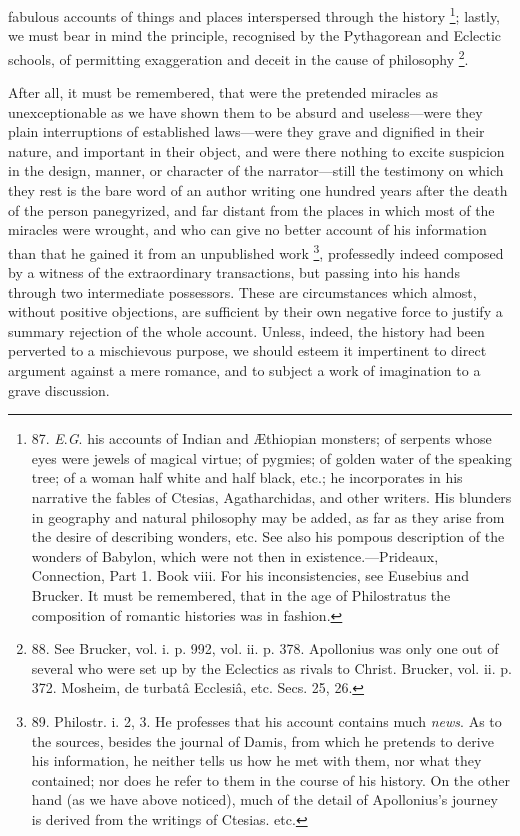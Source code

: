 fabulous accounts of things and places interspersed through the
history \footnote{87.
\emph{E}.\emph{G}. his accounts of Indian and Æthiopian monsters; of
serpents whose eyes were jewels of magical virtue; of pygmies; of
golden water of the speaking tree; of a woman half white and half
black, etc.; he incorporates in his narrative the fables of Ctesias,
Agatharchidas, and other writers. His blunders in geography and
natural philosophy may be added, as far as they arise from the desire
of describing wonders, etc. See also his pompous description of the
wonders of Babylon, which were not then in existence.—Prideaux,
Connection, Part 1. Book viii. For his inconsistencies, see Eusebius
and Brucker. It must be remembered, that in the age of Philostratus
the composition of romantic histories was in fashion.}; lastly, we
must bear in mind the principle, recognised by the Pythagorean and
Eclectic schools, of permitting exaggeration and deceit in the cause
of philosophy \footnote{88.
See Brucker, vol. i. p. 992, vol. ii. p. 378. Apollonius was only one
out of several who were set up by the Eclectics as rivals to Christ.
Brucker, vol. ii. p. 372. Mosheim, de turbatâ Ecclesiâ, etc. Secs.
25, 26.}.

After all, it must be
remembered, that were the pretended miracles as unexceptionable as we
have shown them to be absurd and useless—were they plain
interruptions of established laws—were they grave and dignified in
their nature, and important in their object, and were there nothing to
excite suspicion in the design, manner, or character of the
narrator—still the testimony on which they rest is the bare word of
an author writing one hundred years after the death of the person
panegyrized, and far distant from the places in which most of the
miracles were wrought, and who can give no better account of his
information than that he gained it from an unpublished work \footnote{89.
Philostr. i. 2, 3. He professes that his account contains much \emph{news}.
As to the sources, besides the journal of Damis, from which he
pretends to derive his information, he neither tells us how he met
with them, nor what they contained; nor does he refer to them in the
course of his history. On the other hand (as we have above noticed),
much of the detail of Apollonius's journey is derived from the
writings of Ctesias. etc.}, professedly indeed composed by a witness of the
extraordinary transactions, but passing into his hands through two
intermediate possessors. These are circumstances which almost, without
positive objections, are sufficient by their own negative force to
justify a summary rejection of the whole account. Unless, indeed, the
history had been perverted to a mischievous purpose, we should esteem
it impertinent to direct argument against a mere romance, and to
subject a work of imagination to a grave discussion.

